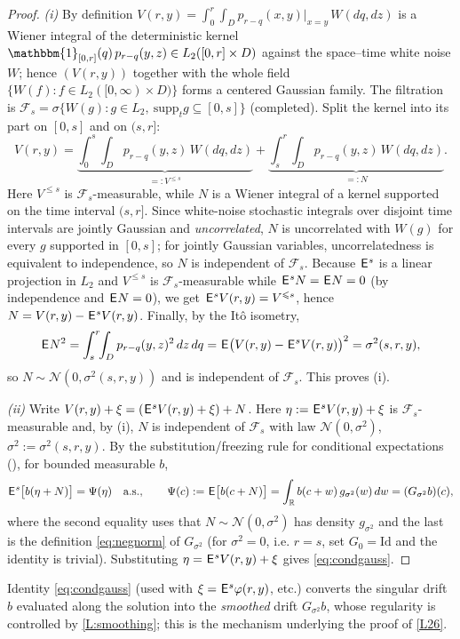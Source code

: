 \documentclass[12pt]{article}
\theoremstyle{definition}
\DeclareMathOperator{\1}{\mathbbm{1}}%
\def\E{\hskip.15ex\mathsf{E}\hskip.10ex}
\def\phi{\varphi}
\renewcommand{\le}{\leqslant}
\newcommand{\F}{\mathcal{F}}
\newcommand{\R}{\mathbb{R}}
\begin{document}
\begin{proof}
\emph{(i)} By definition $V(r,y)=\int_0^r\int_D p_{r-q}(x,y)|_{x=y}\,W(dq,dz)$ is a Wiener
integral of the deterministic kernel $\1_{[0,r]}(q)\,p_{r-q}(y,z)\in L_2([0,r]\times D)$
against the space--time white noise $W$; hence $(V(r,y))$ together with the whole
field $\{W(f):f\in L_2([0,\infty)\times D)\}$ forms a centered Gaussian family. The
filtration is $\F_s=\sigma\{W(g):g\in L_2,\ \mathrm{supp}_t g\subseteq[0,s]\}$
(completed). Split the kernel into its part on $[0,s]$ and on $(s,r]$:
\[
V(r,y)=\underbrace{\int_0^s\!\!\int_D p_{r-q}(y,z)\,W(dq,dz)}_{=:V^{\le s}}
+\underbrace{\int_s^r\!\!\int_D p_{r-q}(y,z)\,W(dq,dz)}_{=:N}.
\]
Here $V^{\le s}$ is $\F_s$-measurable, while $N$ is a Wiener integral of a kernel
supported on the time interval $(s,r]$. Since white-noise stochastic integrals over
disjoint time intervals are jointly Gaussian and \emph{uncorrelated}, $N$ is
uncorrelated with $W(g)$ for every $g$ supported in $[0,s]$; for jointly Gaussian
variables, uncorrelatedness is equivalent to independence, so $N$ is independent of
$\F_s$. Because $\E^s$ is a linear projection in $L_2$ and $V^{\le s}$ is
$\F_s$-measurable while $\E^sN=\E N=0$ (by independence and $\E N=0$), we get
$\E^sV(r,y)=V^{\le s}$, hence $N=V(r,y)-\E^sV(r,y)$. Finally, by the It\^o isometry,
\[
\E N^2=\int_s^r\!\!\int_D p_{r-q}(y,z)^2\,dz\,dq
=\E\bigl(V(r,y)-\E^sV(r,y)\bigr)^2=\sigma^2(s,r,y),
\]
so $N\sim\mathcal N(0,\sigma^2(s,r,y))$ and is independent of $\F_s$. This proves (i).

\emph{(ii)} Write $V(r,y)+\xi=(\E^sV(r,y)+\xi)+N$. Here $\eta:=\E^sV(r,y)+\xi$ is
$\F_s$-measurable and, by (i), $N$ is independent of $\F_s$ with law
$\mathcal N(0,\sigma^2)$, $\sigma^2:=\sigma^2(s,r,y)$. By the substitution/freezing rule
for conditional expectations (\cite[Ch.~II]{ShiryaevProb}), for bounded measurable $b$,
\[
\E^s\bigl[b(\eta+N)\bigr]=\Psi(\eta)\quad\text{a.s.},\qquad
\Psi(c):=\E\bigl[b(c+N)\bigr]=\int_\R b(c+w)\,g_{\sigma^2}(w)\,dw=(G_{\sigma^2}b)(c),
\]
where the second equality uses that $N\sim\mathcal N(0,\sigma^2)$ has density
$g_{\sigma^2}$ and the last is the definition \eqref{eq:negnorm} of $G_{\sigma^2}$
(for $\sigma^2=0$, i.e. $r=s$, set $G_0=\mathrm{Id}$ and the identity is trivial).
Substituting $\eta=\E^sV(r,y)+\xi$ gives \eqref{eq:condgauss}.
\end{proof}

\noindent Identity \eqref{eq:condgauss} (used with $\xi=\E^s\phi(r,y)$, etc.) converts the
singular drift $b$ evaluated along the solution into the \emph{smoothed} drift
$G_{\sigma^2}b$, whose regularity is controlled by \cref{L:smoothing}; this is the
mechanism underlying the proof of \cref{L26}.
\end{document}
